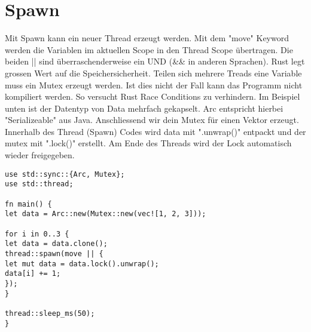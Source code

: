 \section{Spawn}

Mit Spawn kann ein neuer Thread erzeugt werden. Mit dem "move" Keyword werden die Variablen im aktuellen Scope in den Thread Scope übertragen. Die beiden || sind überraschenderweise ein UND (\&\& in anderen Sprachen). Rust legt grossen Wert auf die Speichersicherheit. Teilen sich mehrere Treads eine Variable muss ein Mutex erzeugt werden. Ist dies nicht der Fall kann das Programm nicht kompiliert werden. So versucht Rust Race Conditions zu verhindern.
Im Beispiel unten ist der Datentyp von Data mehrfach gekapselt. Arc entspricht hierbei "Serializeable" aus Java. Anschliessend wir dein Mutex für einen Vektor erzeugt.
Innerhalb des Thread (Spawn) Codes wird data mit ".unwrap()" entpackt und der mutex mit ".lock()" erstellt. Am Ende des Threads wird der Lock automatisch wieder freigegeben.


\begin{lstlisting}
use std::sync::{Arc, Mutex};
use std::thread;

fn main() {
let data = Arc::new(Mutex::new(vec![1, 2, 3]));

for i in 0..3 {
let data = data.clone();
thread::spawn(move || {
let mut data = data.lock().unwrap();
data[i] += 1;
});
}

thread::sleep_ms(50);
}
\end{lstlisting}